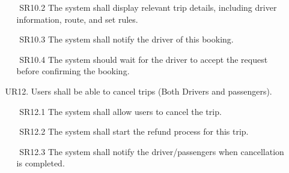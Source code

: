 \documentclass[a4paper, 12pt]{report} %
\begin{document}
\begin{itemize}
\begin{itemize}
                    \item [$ $] SR10.2  The system shall display relevant trip details, including driver information, route, and set rules. 
                    \item [$ $] SR10.3 The system shall notify the driver of this booking.
                    \item [$ $] SR10.4 The system should wait for the driver to accept the request before confirming the booking.
                \end{itemize}
                \item [$ $] UR12. Users shall be able to cancel trips (Both Drivers and passengers).
                \begin{itemize}
                    \item [$ $] SR12.1 The system shall allow users to cancel the trip.
                    \item [$ $] SR12.2 The system shall start the refund process for this trip.
                    \item [$ $] SR12.3 The system shall notify the driver/passengers when cancellation is completed.
                \end{itemize}

\end{itemize}
\end{document}
